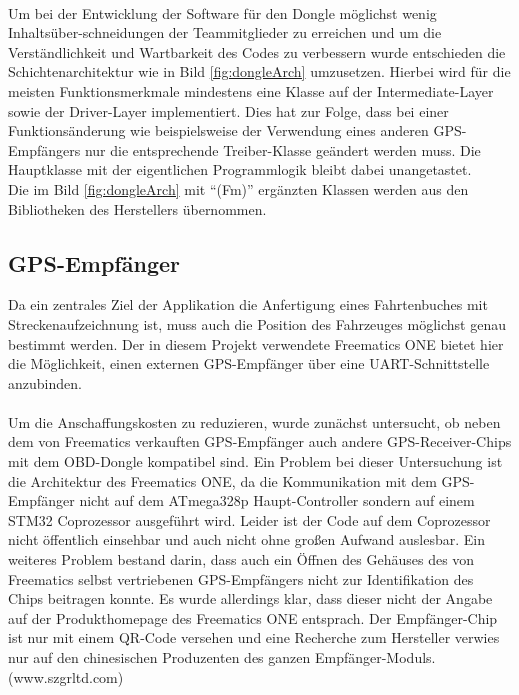 \paragraph{}
Um bei der Entwicklung der Software für den Dongle möglichst wenig Inhaltsüber-schneidungen der Teammitglieder zu erreichen und um die Verständlichkeit und Wartbarkeit des Codes zu verbessern wurde entschieden die Schichtenarchitektur wie in Bild \ref{fig:dongleArch} umzusetzen.
Hierbei wird für die meisten Funktionsmerkmale mindestens eine Klasse auf der Intermediate-Layer sowie der Driver-Layer implementiert. Dies hat zur Folge, dass bei einer Funktionsänderung wie beispielsweise der Verwendung eines anderen GPS-Empfängers nur die entsprechende Treiber-Klasse geändert werden muss. Die Hauptklasse mit der eigentlichen Programmlogik bleibt dabei unangetastet.\\
Die im Bild \ref{fig:dongleArch} mit \enquote{(Fm)} ergänzten Klassen werden aus den Bibliotheken des Herstellers übernommen.
\subsection{GPS-Empfänger}
Da ein zentrales Ziel der Applikation die Anfertigung eines Fahrtenbuches mit Streckenaufzeichnung ist, muss auch die Position des Fahrzeuges möglichst genau bestimmt werden. Der in diesem Projekt verwendete Freematics ONE bietet hier die Möglichkeit, einen externen GPS-Empfänger über eine \ac{UART}-Schnittstelle anzubinden.
\paragraph{}
Um die Anschaffungskosten zu reduzieren, wurde zunächst untersucht, ob neben dem von Freematics verkauften GPS-Empfänger auch andere GPS-Receiver-Chips mit dem OBD-Dongle kompatibel sind.
Ein Problem bei dieser Untersuchung ist die Architektur des Freematics ONE, da die Kommunikation mit dem GPS-Empfänger nicht auf dem ATmega328p Haupt-Controller sondern auf einem STM32 Coprozessor ausgeführt wird. Leider ist der Code auf dem Coprozessor nicht öffentlich einsehbar und auch nicht ohne großen Aufwand auslesbar.
Ein weiteres Problem bestand darin, dass auch ein Öffnen des Gehäuses des von Freematics selbst vertriebenen GPS-Empfängers nicht zur Identifikation des Chips beitragen konnte. Es wurde allerdings klar, dass dieser nicht der Angabe auf der Produkthomepage des Freematics ONE entsprach. Der Empfänger-Chip ist nur mit einem QR-Code versehen und eine Recherche zum Hersteller verwies nur auf den chinesischen Produzenten des ganzen Empfänger-Moduls.(www.szgrltd.com)
